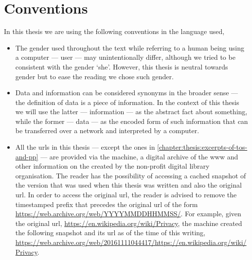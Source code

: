 \section{Conventions}
    \label{section:thesis:conventions}
In this thesis we are using the following conventions in the language used,
\begin{itemize}
    \item The gender used throughout the text while referring to a human being using 
    a computer --- user --- may unintentionally differ, although we tried to be 
    consistent with the gender `she'. However, this thesis is neutral towards gender 
    but to ease the reading we chose such gender.

    \item Data and information can be considered synonyms in the broader sense --- 
    the definition of data is a piece of information. In the context of this thesis 
    we will use the latter --- information --- as the abstract fact about something, 
    while the former --- data --- as the encoded form of such information that can 
    be transferred over a network and interpreted by a computer.
    
    \item All the \acp{url} in this thesis --- except the ones in \cref{chapter:thesis:excerpts-of-tos-and-pp} ---
    are provided via the \Wayback machine, a digital archive of the \ac{www} and 
    other information on the \Internet created by the \InternetArchive non-profit 
    digital library organisation. The reader has the possibility of accessing a cached 
    snapshot of the version that was used when this thesis was written and also 
    the original \ac{url}. In order to access the original \ac{url}, the reader 
    is advised to remove the timestamped prefix that precedes the original \ac{url} 
    of the form \url{https://web.archive.org/web/YYYYMMDDHHMMSS/}. For example, 
    given the original \ac{url}, \url{https://en.wikipedia.org/wiki/Privacy}, the 
    \Wayback machine created the following snapshot and its \ac{url} as of the time 
    of this writing, \url{https://web.archive.org/web/20161111044417/https://en.wikipedia.org/wiki/Privacy}.
\end{itemize}
